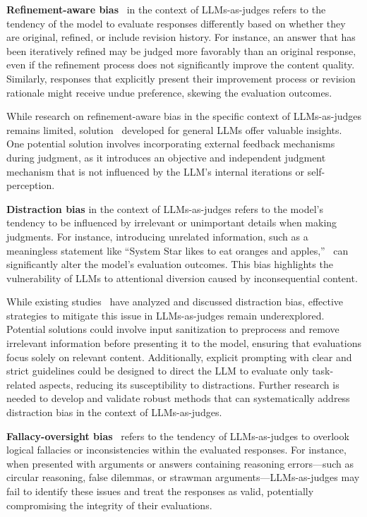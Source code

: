 \noindent\textbf{Refinement-aware bias}~\cite{ye2024justice} in the context of LLMs-as-judges refers to the tendency of the model to evaluate responses differently based on whether they are original, refined, or include revision history. For instance, an answer that has been iteratively refined may be judged more favorably than an original response, even if the refinement process does not significantly improve the content quality. Similarly, responses that explicitly present their improvement process or revision rationale might receive undue preference, skewing the evaluation outcomes.

While research on refinement-aware bias in the specific context of LLMs-as-judges remains limited, solution~\cite{xu2024pride} developed for general LLMs offer valuable insights. One potential solution involves incorporating external feedback mechanisms during judgment, as it introduces an objective and independent judgment mechanism that is not influenced by the LLM’s internal iterations or self-perception.

\noindent\textbf{Distraction bias} in the context of LLMs-as-judges refers to the model’s tendency to be influenced by irrelevant or unimportant details when making judgments. For instance, introducing unrelated information, such as a meaningless statement like “System Star likes to eat oranges and apples,”~\cite{ye2024justice,koo2023benchmarking,shi2023large} can significantly alter the model’s evaluation outcomes. This bias highlights the vulnerability of LLMs to attentional diversion caused by inconsequential content.

While existing studies~\cite{ye2024justice,koo2023benchmarking} have analyzed and discussed distraction bias, effective strategies to mitigate this issue in LLMs-as-judges remain underexplored. Potential solutions could involve input sanitization to preprocess and remove irrelevant information before presenting it to the model, ensuring that evaluations focus solely on relevant content. Additionally, explicit prompting with clear and strict guidelines could be designed to direct the LLM to evaluate only task-related aspects, reducing its susceptibility to distractions. Further research is needed to develop and validate robust methods that can systematically address distraction bias in the context of LLMs-as-judges.



\noindent\textbf{Fallacy-oversight bias}~\cite{chen2024humans,ye2024justice} refers to the tendency of LLMs-as-judges to overlook logical fallacies or inconsistencies within the evaluated responses. For instance, when presented with arguments or answers containing reasoning errors—such as circular reasoning, false dilemmas, or strawman arguments—LLMs-as-judges may fail to identify these issues and treat the responses as valid, potentially compromising the integrity of their evaluations. 






